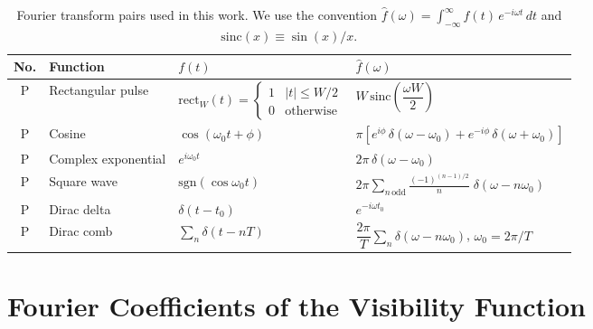 \documentclass[preprint]{aastex702}
\newcommand{\FT}[1]{\hat{#1}}
\newcounter{ftpair}
\renewcommand{\theftpair}{P\arabic{ftpair}}
\begin{document}
\begin{table}[ht!]
\centering
\caption{Fourier transform pairs used in this work. We use the convention $\FT{f}(\omega) = \int_{-\infty}^{\infty} f(t)\,e^{-i\omega t}\,dt$ and $\mathrm{sinc}(x) \equiv \sin(x)/x$.}
\label{tab:fourier_pairs}
\setcounter{ftpair}{0}
\begin{tabular}{clll}
    \hline
    \textbf{No.} & \textbf{Function} & $f(t)$ & $\FT{f}(\omega)$ \\
    \hline
    {ftpair}\label{fp:rect}\theftpair &
    Rectangular pulse &
    $\mathrm{rect}_W(t) = \begin{cases} 1 & |t| \leq W/2 \\ 0 & \text{otherwise} \end{cases}$ &
    $W\,\mathrm{sinc}\!\left(\dfrac{\omega W}{2}\right)$ \\[16pt]
    {ftpair}\label{fp:cosine}\theftpair &
    Cosine &
    $\cos(\omega_0 t + \phi)$ &
    $\pi\left[e^{i\phi}\,\delta(\omega - \omega_0) + e^{-i\phi}\,\delta(\omega + \omega_0)\right]$ \\[10pt]
    {ftpair}\label{fp:exp}\theftpair &
    Complex exponential &
    $e^{i\omega_0 t}$ &
    $2\pi\,\delta(\omega - \omega_0)$ \\[10pt]
    {ftpair}\label{fp:sqwave}\theftpair &
    Square wave &
    $\mathrm{sgn}(\cos\omega_0 t)$ &
    $\displaystyle 2\pi\sum_{n\,\text{odd}} \frac{(-1)^{(n-1)/2}}{n}\;\delta(\omega - n\omega_0)$ \\[14pt]
    {ftpair}\label{fp:delta}\theftpair &
    Dirac delta &
    $\delta(t - t_0)$ &
    $e^{-i\omega t_0}$ \\[8pt]
    {ftpair}\label{fp:comb}\theftpair &
    Dirac comb &
    $\displaystyle\sum_n \delta(t - nT)$ &
    $\dfrac{2\pi}{T}\displaystyle\sum_n \delta(\omega - n\omega_0)$, \; $\omega_0 = 2\pi/T$ \\[14pt]
    \hline
\end{tabular}
\end{table}


\section{Fourier Coefficients of the Visibility Function} \label{app:fourier_visibility}
\end{document}
